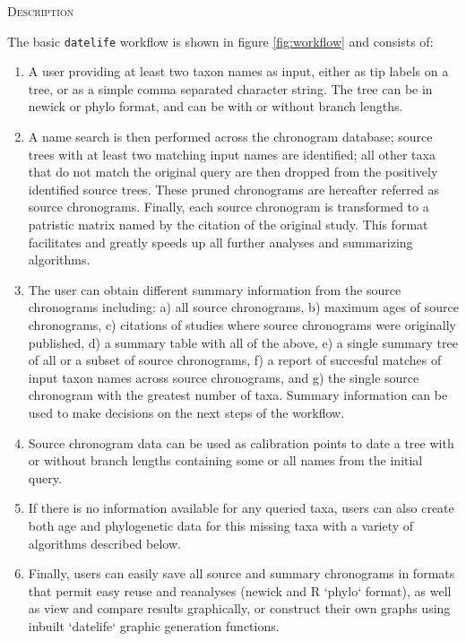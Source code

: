 \documentclass[11pt,]{article}
\begin{document}
\begin{center}
\textsc{Description}
\end{center}

The basic \texttt{datelife} workflow is shown in figure
\ref{fig:workflow} and consists of:

\begin{enumerate}
\item A user providing at least two taxon names as input, either as tip labels on a tree, or as a simple comma separated character string. The tree can be in newick or phylo format, and can be with or without branch lengths.
\item A name search is then performed across the chronogram database; source trees with at least two matching input names are identified; all other taxa that do not match the original query are then dropped from the positively identified source trees. These pruned chronograms are hereafter referred as source chronograms. Finally, each source chronogram is transformed to a patristic matrix named by the citation of the original study. This format facilitates and greatly speeds up all further analyses and summarizing algorithms.
\item  The user can obtain different summary information from the source chronograms including: a) all source chronograms, b) maximum ages of source chronograms, c) citations of studies where source chronograms were originally published, d) a summary table with all of the above, e) a single summary tree of all or a subset of source chronograms, f) a report of succesful matches of input taxon names across source chronograms, and g) the single source chronogram with the greatest number of taxa. Summary information can be used to make decisions on the next steps of the workflow.
\item  Source chronogram data can be used as calibration points to date a tree with or without branch lengths containing some or all names from the initial query. %
\item  If there is no information available for any queried taxa, users can also create both age and phylogenetic data for this missing taxa with a variety of algorithms described below.
\item  Finally, users can easily save all source and summary chronograms in formats that permit easy reuse and reanalyses (newick and R `phylo` format), as well as view and compare results graphically, or construct their own graphs using inbuilt `datelife` graphic generation functions.
\end{enumerate}
\end{document}
